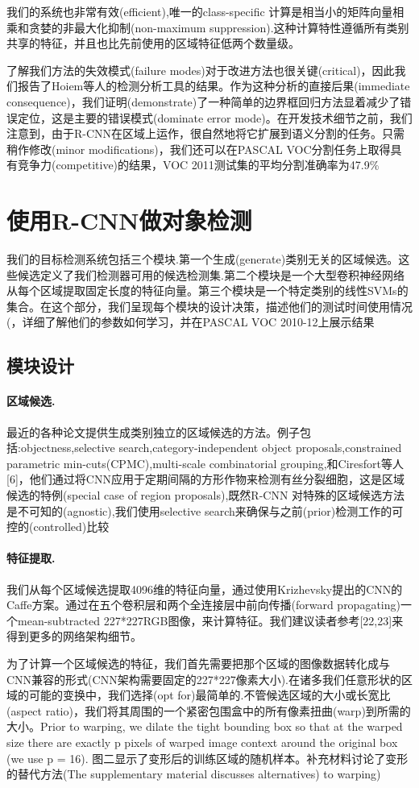 \documentclass[a4paper,UTF8]{ctexart}
\theoremstyle{definition}
\begin{document}
我们的系统也非常有效(efficient),唯一的class-specific 计算是相当小的矩阵向量相乘和贪婪的非最大化抑制(non-maximum suppression).这种计算特性遵循所有类别共享的特征，并且也比先前使用的区域特征低两个数量级。

了解我们方法的失效模式(failure modes)对于改进方法也很关键(critical)，因此我们报告了Hoiem等人的检测分析工具的结果。作为这种分析的直接后果(immediate consequence)，我们证明(demonstrate)了一种简单的边界框回归方法显着减少了错误定位，这是主要的错误模式(dominate error mode)。在开发技术细节之前，我们注意到，由于R-CNN在区域上运作，很自然地将它扩展到语义分割的任务。只需稍作修改(minor modifications)，我们还可以在PASCAL VOC分割任务上取得具有竞争力(competitive)的结果，VOC 2011测试集的平均分割准确率为47.9\%
\section{使用R-CNN做对象检测}
我们的目标检测系统包括三个模块.第一个生成(generate)类别无关的区域候选。这些候选定义了我们检测器可用的候选检测集.第二个模块是一个大型卷积神经网络从每个区域提取固定长度的特征向量。第三个模块是一个特定类别的线性SVMs的集合。在这个部分，我们呈现每个模块的设计决策，描述他们的测试时间使用情况(，详细了解他们的参数如何学习，并在PASCAL VOC 2010-12上展示结果
\subsection{模块设计}
\paragraph{区域候选.} 最近的各种论文提供生成类别独立的区域候选的方法。例子包括:objectness,selective search,category-independent object proposals,constrained parametric min-cuts(CPMC),multi-scale combinatorial grouping,和Ciresfort等人 [6]，他们通过将CNN应用于定期间隔的方形作物来检测有丝分裂细胞，这是区域候选的特例(special case of region proposals),既然R-CNN 对特殊的区域候选方法是不可知的(agnostic),我们使用selective search来确保与之前(prior)检测工作的可控的(controlled)比较
\paragraph{特征提取.} 我们从每个区域候选提取4096维的特征向量，通过使用Krizhevsky提出的CNN的Caffe方案。通过在五个卷积层和两个全连接层中前向传播(forward propagating)一个mean-subtracted 227*227RGB图像，来计算特征。我们建议读者参考[22,23]来得到更多的网络架构细节。

为了计算一个区域候选的特征，我们首先需要把那个区域的图像数据转化成与CNN兼容的形式(CNN架构需要固定的227*227像素大小).在诸多我们任意形状的区域的可能的变换中，我们选择(opt for)最简单的.不管候选区域的大小或长宽比(aspect ratio)，我们将其周围的一个紧密包围盒中的所有像素扭曲(warp)到所需的大小。Prior to warping, we dilate the tight bounding box so that at the warped size there are exactly p pixels of warped image context around the original box (we use p = 16). 图二显示了变形后的训练区域的随机样本。补充材料讨论了变形的替代方法(The supplementary material discusses alternatives) to warping)
\end{document}
